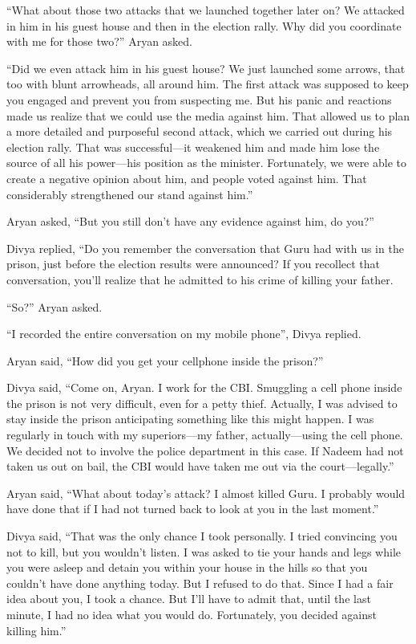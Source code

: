 “What about those two attacks that we launched together later on? We attacked in
him in his guest house and then in the election rally. Why did you coordinate
with me for those two?” Aryan asked.

“Did we even attack him in his guest house? We just launched some arrows, that
too with blunt arrowheads, all around him. The first attack was supposed to keep
you engaged and prevent you from suspecting me. But his panic and reactions made
us realize that we could use the media against him. That allowed us to plan a
more detailed and purposeful second attack, which we carried out during his
election rally. That was successful—it weakened him and made him lose the
source of all his power—his position as the minister. Fortunately, we were
able to create a negative opinion about him, and people voted against him. That
considerably strengthened our stand against him.”

Aryan asked, “But you still don't have any evidence against him, do you?”

Divya replied, “Do you remember the conversation that Guru had with us in the
prison, just before the election results were announced? If you recollect that
conversation, you'll realize that he admitted to his crime of killing your
father.

“So?” Aryan asked.

“I recorded the entire conversation on my mobile phone”, Divya replied.

Aryan said, “How did you get your cellphone inside the prison?”

Divya said, “Come on, Aryan. I work for the CBI. Smuggling a cell phone inside
the prison is not very difficult, even for a petty thief. Actually, I was
advised to stay inside the prison anticipating something like this might happen.
I was regularly in touch with my superiors—my father, actually—using the cell
phone. We decided not to involve the police department in this case. If Nadeem
had not taken us out on bail, the CBI would have taken me out via the
court—legally.”

Aryan said, “What about today's attack? I almost killed Guru. I probably would
have done that if I had not turned back to look at you in the last moment.”

Divya said, “That was the only chance I took personally. I tried convincing you
not to kill, but you wouldn't listen. I was asked to tie your hands and legs
while you were asleep and detain you within your house in the hills so that you
couldn't have done anything today. But I refused to do that. Since I had a fair
idea about you, I took a chance. But I'll have to admit that, until the last
minute, I had no idea what you would do. Fortunately, you decided against
killing him.”

